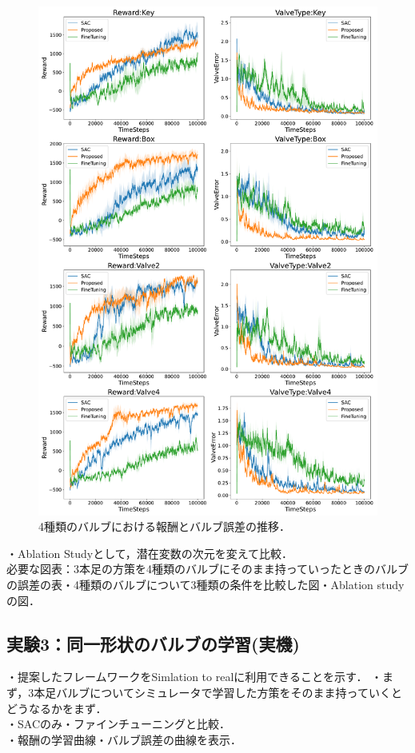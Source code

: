 \documentclass[dvipdfmx]{ampbt_nomag}
\begin{document}
\begin{figure}[hbtp]
  \centering
  \includegraphics[width=16cm]
       {asset/img/SimTurn90.pdf}
  \caption{4種類のバルブにおける報酬とバルブ誤差の推移．}
  \label{dclaw_mujoco}
\end{figure}
・Ablation Studyとして，潜在変数の次元を変えて比較．\\
必要な図表：3本足の方策を4種類のバルブにそのまま持っていったときのバルブの誤差の表・4種類のバルブについて3種類の条件を比較した図・Ablation studyの図．\\

\subsection{実験3：同一形状のバルブの学習(実機)}
・提案したフレームワークをSimlation to realに利用できることを示す．
・まず，3本足バルブについてシミュレータで学習した方策をそのまま持っていくとどうなるかをまず．\\
・SACのみ・ファインチューニングと比較．\\
・報酬の学習曲線・バルブ誤差の曲線を表示．
\end{document}
